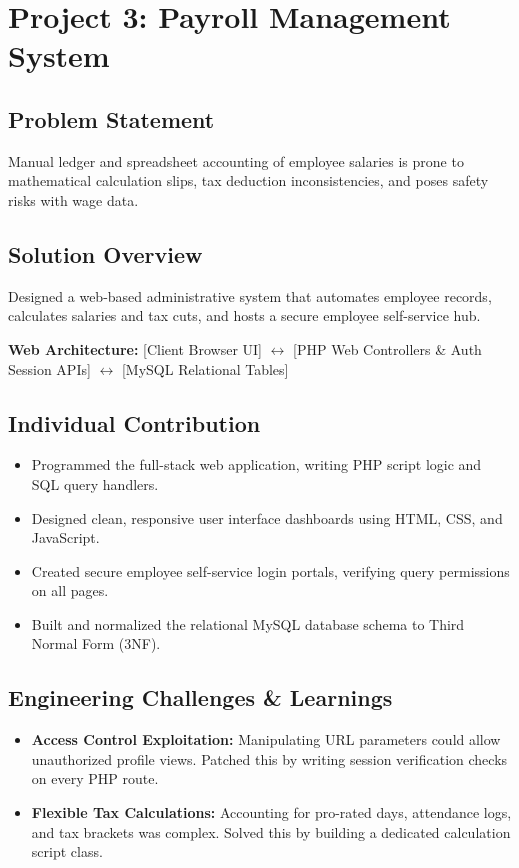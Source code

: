 \documentclass[11pt,letterpaper]{article}
\begin{document}
\newpage

\section{Project 3: Payroll Management System}

\subsection{Problem Statement}
Manual ledger and spreadsheet accounting of employee salaries is prone to mathematical calculation slips, tax deduction inconsistencies, and poses safety risks with wage data.

\subsection{Solution Overview}
Designed a web-based administrative system that automates employee records, calculates salaries and tax cuts, and hosts a secure employee self-service hub. 

\begin{center}
    \small
    \textbf{Web Architecture:} [Client Browser UI] $\leftrightarrow$ [PHP Web Controllers \& Auth Session APIs] $\leftrightarrow$ [MySQL Relational Tables]
\end{center}

\subsection{Individual Contribution}
\begin{itemize}
    \item Programmed the full-stack web application, writing PHP script logic and SQL query handlers.
    \item Designed clean, responsive user interface dashboards using HTML, CSS, and JavaScript.
    \item Created secure employee self-service login portals, verifying query permissions on all pages.
    \item Built and normalized the relational MySQL database schema to Third Normal Form (3NF).
\end{itemize}

\subsection{Engineering Challenges \& Learnings}
\begin{itemize}
    \item \textbf{Access Control Exploitation:} Manipulating URL parameters could allow unauthorized profile views. Patched this by writing session verification checks on every PHP route.
    \item \textbf{Flexible Tax Calculations:} Accounting for pro-rated days, attendance logs, and tax brackets was complex. Solved this by building a dedicated calculation script class.
\end{itemize}
\end{document}

